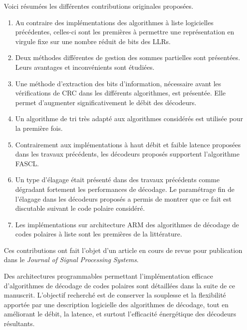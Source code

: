 Voici résumées les différentes contributions originales proposées.
\begin{enumerate}[label=(\roman*)]
  \item Au contraire des implémentations des algorithmes à liste logicielles précédentes, celles-ci sont les premières à permettre une représentation en virgule fixe sur une nombre réduit de bits des LLRs.
  \item Deux méthodes différentes de gestion des sommes partielles sont présentées. Leurs avantages et inconvénients sont étudiées.
  \item Une méthode d'extraction des bits d'information, nécessaire avant les vérifications de CRC dans les différents algorithmes, est présentée. Elle permet d'augmenter significativement le débit des décodeurs.
  \item Un algorithme de tri \cite{schreier_tournament_1932} très adapté aux algorithmes considérés est utilisée pour la première fois.
  \item Contrairement aux implémentations à haut débit et faible latence proposées dans les travaux précédents, les décodeurs proposés supportent l'algorithme FASCL.
  \item Un type d'élagage était présenté dans des travaux précédents comme dégradant fortement les performances de décodage. Le paramétrage fin de l'élagage dans les décodeurs proposés a permis de montrer que ce fait est discutable suivant le code polaire considéré.
  \item Les implémentations sur architecture ARM des algorithmes de décodage de codes polaires à liste sont les premières de la littérature.
\end{enumerate}
Ces contributions ont fait l'objet d'un article en cours de revue \cite{leonardon_fast_2017} pour publication dans le \textit{Journal of Signal Processing Systems}.


Des architectures programmables permettant l'implémentation efficace d'algorithmes de décodage de codes polaires sont détaillées dans la suite de ce manuscrit. L'objectif recherché est de conserver  la souplesse et la flexibilité apportée par une description logicielle des algorithmes de décodage, tout en améliorant le débit, la latence, et surtout l'efficacité énergétique des décodeurs résultants.